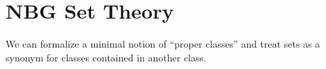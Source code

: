 \section{NBG Set Theory}
\begin{node}\label{set-0001}%
We can formalize a minimal notion of ``proper classes'' and treat
sets as a synonym for classes contained in another class.
  
\end{node}
